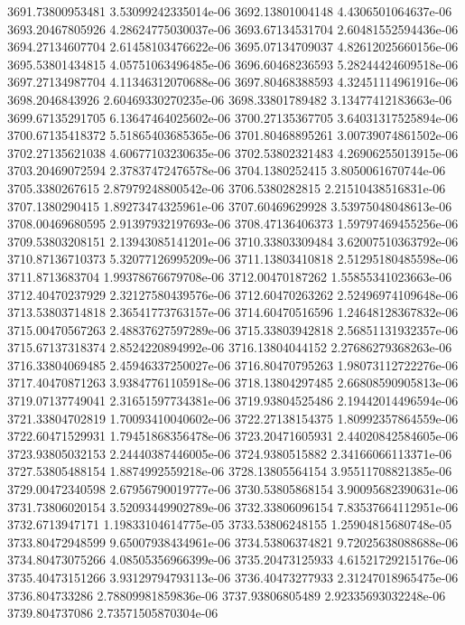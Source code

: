 {3691.73800953481 3.53099242335014e-06
3692.13801004148 4.4306501064637e-06
3693.20467805926 4.28624775030037e-06
3693.67134531704 2.60481552594436e-06
3694.27134607704 2.61458103476622e-06
3695.07134709037 4.82612025660156e-06
3695.53801434815 4.05751063496485e-06
3696.60468236593 5.28244424609518e-06
3697.27134987704 4.11346312070688e-06
3697.80468388593 4.32451114961916e-06
3698.2046843926 2.60469330270235e-06
3698.33801789482 3.13477412183663e-06
3699.67135291705 6.13647464025602e-06
3700.27135367705 3.64031317525894e-06
3700.67135418372 5.51865403685365e-06
3701.80468895261 3.00739074861502e-06
3702.27135621038 4.60677103230635e-06
3702.53802321483 4.26906255013915e-06
3703.20469072594 2.37837472476578e-06
3704.1380252415 3.8050061670744e-06
3705.3380267615 2.87979248800542e-06
3706.5380282815 2.21510438516831e-06
3707.1380290415 1.89273474325961e-06
3707.60469629928 3.53975048048613e-06
3708.00469680595 2.91397932197693e-06
3708.47136406373 1.59797469455256e-06
3709.53803208151 2.13943085141201e-06
3710.33803309484 3.62007510363792e-06
3710.87136710373 5.32077126995209e-06
3711.13803410818 2.51295180485598e-06
3711.8713683704 1.99378676679708e-06
3712.00470187262 1.55855341023663e-06
3712.40470237929 2.32127580439576e-06
3712.60470263262 2.52496974109648e-06
3713.53803714818 2.36541773763157e-06
3714.60470516596 1.24648128367832e-06
3715.00470567263 2.48837627597289e-06
3715.33803942818 2.56851131932357e-06
3715.67137318374 2.8524220894992e-06
3716.13804044152 2.27686279368263e-06
3716.33804069485 2.45946337250027e-06
3716.80470795263 1.98073112722276e-06
3717.40470871263 3.93847761105918e-06
3718.13804297485 2.66808590905813e-06
3719.07137749041 2.31651597734381e-06
3719.93804525486 2.19442014496594e-06
3721.33804702819 1.70093410040602e-06
3722.27138154375 1.80992357864559e-06
3722.60471529931 1.79451868356478e-06
3723.20471605931 2.44020842584605e-06
3723.93805032153 2.24440387446005e-06
3724.9380515882 2.34166066113371e-06
3727.53805488154 1.8874992559218e-06
3728.13805564154 3.95511708821385e-06
3729.00472340598 2.67956790019777e-06
3730.53805868154 3.90095682390631e-06
3731.73806020154 3.52093449902789e-06
3732.33806096154 7.83537664112951e-06
3732.6713947171 1.19833104614775e-05
3733.53806248155 1.25904815680748e-05
3733.80472948599 9.65007938434961e-06
3734.53806374821 9.72025638088688e-06
3734.80473075266 4.08505356966399e-06
3735.20473125933 4.61521729215176e-06
3735.40473151266 3.93129794793113e-06
3736.40473277933 2.31247018965475e-06
3736.804733286 2.78809981859836e-06
3737.93806805489 2.92335693032248e-06
3739.804737086 2.73571505870304e-06
}

